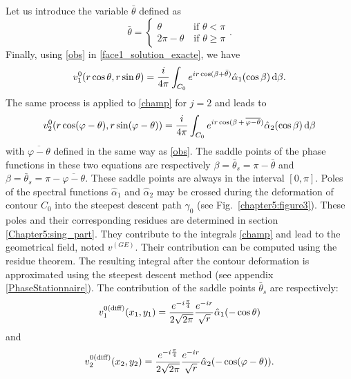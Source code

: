 Let us introduce the variable $\bar{\theta}$ defined as
\begin{equation}
\label{obs}
\bar{\theta} =
\begin{cases}
\theta \qquad \quad \; \text{if } \theta < \pi \\ 
2\pi - \theta \quad \text{if } \theta \geq \pi 
\end{cases}.
\end{equation}
Finally, using \eqref{obs} in \eqref{face1_solution_exacte}, we have
\begin{equation}
v_1^0(r \cos \theta,r \sin \theta) = \dfrac{i}{4 \pi} \int_{C_0}  e^{i r \cos ( \beta + \bar{\theta})} \hat{\alpha}_1(\cos \beta)  \, {\rm d}\beta.
\end{equation}
The same process is applied to \eqref{champ} for $j=2$ and leads to
\begin{equation}
v_2^0(r \cos (\varphi - \theta),r \sin (\varphi - \theta)) = \dfrac{i}{4 \pi} \int_{C_0}  e^{i r \cos ( \beta \, + \, \overline{\varphi - \theta})}  \hat{\alpha}_2( \cos \beta) \, {\rm d}\beta
\end{equation}
with $\overline{\varphi - \theta}$ defined in the same way as \eqref{obs}. The saddle points of the phase functions in these two equations are respectively $\beta = \bar{\theta}_s = \pi - \bar{\theta} $ and $\beta = \bar{\theta}_s = \pi - \overline{\varphi-\theta}$. These saddle points are always in the interval $[0,\pi]$. Poles of the spectral functions $\hat{\alpha}_1$ and $\hat{\alpha}_2$ may be crossed during the deformation of contour $C_0$ into the steepest descent path $\gamma_0$ (see Fig.~\ref{chapter5:figure3}). These poles and their corresponding residues are determined in section \ref{Chapter5:sing_part}. They contribute to the integrals \eqref{champ} and lead to the geometrical field, noted $v^{(GE)}$. Their contribution can be computed using the residue theorem. The resulting integral after the contour deformation is approximated using the steepest descent method (see appendix \ref{PhaseStationnaire}). The contribution of the saddle points $  \bar{\theta}_s $ are respectively:
\begin{equation}
\label{diffracted_field1}
v_1^{0 \rm (diff)}(x_1,y_1) = \dfrac{e^{-i\frac{\pi}{4}}}{2\sqrt{2\pi}}\dfrac{e^{-ir}}{\sqrt{r}} \hat{\alpha}_1( - \cos \theta)   
\end{equation}
and
\begin{equation}
\label{diffracted_field2}
v_2^{0 \rm (diff)}(x_2,y_2) = \dfrac{e^{-i\frac{\pi}{4}}}{2\sqrt{2\pi}} \dfrac{e^{-ir}}{\sqrt{r}} \hat{\alpha}_2( - \cos ( \varphi - \theta)).   
\end{equation}
